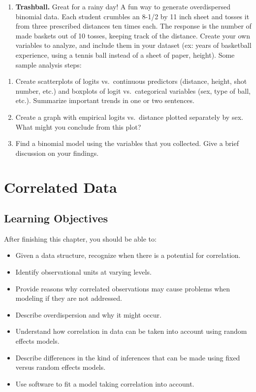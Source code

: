 \documentclass[
]{krantz}
\providecommand{\tightlist}{%
  \setlength{\itemsep}{0pt}\setlength{\parskip}{0pt}}
\begin{document}
\begin{enumerate}
\def\labelenumi{\arabic{enumi}.}
\setcounter{enumi}{3}
\tightlist
\item
  \textbf{Trashball.} Great for a rainy day! A fun way to generate overdispersed binomial data. Each student crumbles an 8-1/2 by 11 inch sheet and tosses it from three prescribed distances ten times each. The response is the number of made baskets out of 10 tosses, keeping track of the distance. Create your own variables to analyze, and include them in your dataset (ex: years of basketball experience, using a tennis ball instead of a sheet of paper, height). Some sample analysis steps:
\end{enumerate}

\begin{enumerate}
\def\labelenumi{\alph{enumi}.}
\tightlist
\item
  Create scatterplots of logits vs.~continuous predictors (distance, height, shot number, etc.) and boxplots of logit vs.~categorical variables (sex, type of ball, etc.). Summarize important trends in one or two sentences.
\item
  Create a graph with empirical logits vs.~distance plotted separately by sex. What might you conclude from this plot?
\item
  Find a binomial model using the variables that you collected. Give a brief discussion on your findings.
\end{enumerate}

\hypertarget{ch-corrdata}{%
\chapter{Correlated Data}\label{ch-corrdata}}

\hypertarget{learning-objectives-6}{%
\section{Learning Objectives}\label{learning-objectives-6}}

After finishing this chapter, you should be able to:

\begin{itemize}
\tightlist
\item
  Given a data structure, recognize when there is a potential for correlation.
\item
  Identify observational units at varying levels.
\item
  Provide reasons why correlated observations may cause problems when modeling if they are not addressed.
\item
  Describe overdispersion and why it might occur.
\item
  Understand how correlation in data can be taken into account using random effects models.
\item
  Describe differences in the kind of inferences that can be made using fixed versus random effects models.
\item
  Use software to fit a model taking correlation into account.
\end{itemize}
\end{document}
